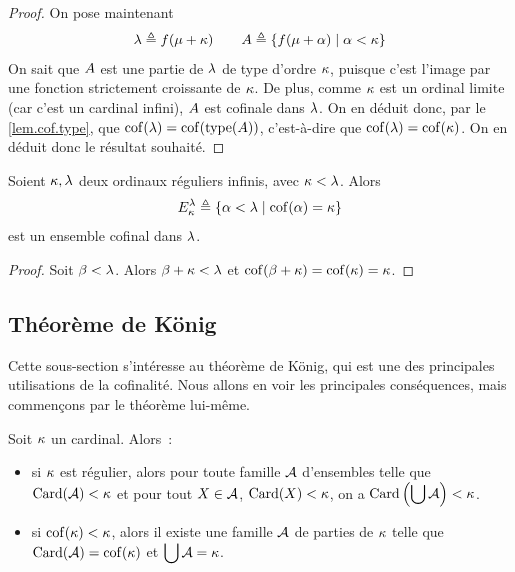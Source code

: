 \begin{proof}
  On pose maintenant
  \[\lambda \triangleq f(\mu + \kappa)\qquad
  A \triangleq \left\{ f(\mu + \alpha) \;\middle\vert\; \alpha < \kappa \right\}\]
  On sait que $A$ est une partie de $\lambda$ de type d'ordre $\kappa$,
  puisque c'est l'image par une fonction strictement croissante de $\kappa$. De
  plus, comme $\kappa$ est un ordinal limite (car c'est un cardinal infini),
  $A$ est cofinale dans $\lambda$. On en déduit donc, par le
  \cref{lem.cof.type}, que $\operatorname{cof}(\lambda) = \operatorname{cof}(\operatorname{type}(A))$, c'est-à-dire
  que $\operatorname{cof}(\lambda) = \operatorname{cof}(\kappa)$. On en déduit donc le résultat souhaité.
\end{proof}

\begin{proposition}\label{prop.Eij}
  Soient $\kappa, \lambda$ deux ordinaux réguliers infinis, avec
  $\kappa < \lambda$. Alors
  \[E_{\kappa}^{\lambda} \triangleq \left\{ \alpha<\lambda \;\middle\vert\; \operatorname{cof}(\alpha) = \kappa \right\}\]
  est un ensemble cofinal dans $\lambda$.
\end{proposition}

\begin{proof}
  Soit $\beta < \lambda$. Alors $\beta + \kappa < \lambda$ et
  $\operatorname{cof}(\beta + \kappa) = \operatorname{cof}(\kappa) = \kappa$.
\end{proof}

\subsection{Théorème de König}

Cette sous-section s'intéresse au théorème de König, qui est une des principales
utilisations de la cofinalité. Nous allons en voir les principales conséquences,
mais commençons par le théorème lui-même.

\begin{theorem}\label{thm.Konig}
  Soit $\kappa$ un cardinal. Alors~:
  \begin{itemize}
  \item si $\kappa$ est régulier, alors pour toute famille $\mathcal A$
    d'ensembles telle que $\operatorname{Card}(\mathcal A) < \kappa$ et pour tout $X\in\mathcal A$,
    $\operatorname{Card}(X) < \kappa$, on a
    $\displaystyle\operatorname{Card}\left(\bigcup \mathcal A\right) < \kappa$.
  \item si $\operatorname{cof}(\kappa) < \kappa$, alors il existe une famille $\mathcal A$
    de parties de $\kappa$ telle que $\operatorname{Card}(\mathcal A) = \operatorname{cof}(\kappa)$ et
    $\displaystyle\bigcup\mathcal A =\kappa$.
  \end{itemize}
\end{theorem}


